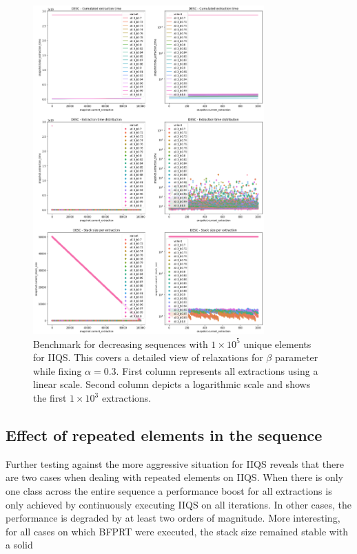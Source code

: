 \begin{figure}[!ht]
    \centering
    \includegraphics[width=0.79\textwidth]{./fragments/04_experimental_execution/images/04_alphabeta_detail_decreasing_right.png}
    \caption{Benchmark for decreasing sequences with $1\times10^5$ unique elements for IIQS. This covers a detailed view of relaxations for $\beta$ parameter while fixing $\alpha=0.3$.  First column represents all extractions using a linear scale. Second column depicts a logarithmic scale and shows the first $1\times10^3$ extractions. }
    \label{FIG:05_ALPHABETA_BENCHMARK_DESC_RIGHT}
\end{figure}

\subsection{Effect of repeated elements in the sequence}

Further testing against the more aggressive situation for IIQS reveals that there are two cases when dealing with repeated elements on IIQS. When there is only one class across the entire sequence a performance boost for all extractions is only achieved by continuously executing IIQS on all iterations. In other cases, the performance is degraded by at least two orders of magnitude. More interesting, for all cases on which BFPRT were executed, the stack size remained stable with a solid %

